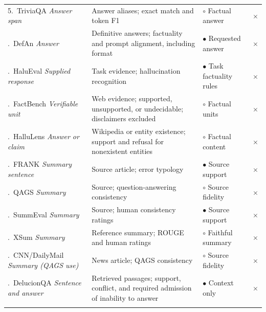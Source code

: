 \documentclass{clv2025}
\newcommand{\Stated}{\ensuremath{\bullet}}
\newcommand{\Weak}{\ensuremath{\circ}}
\newcommand{\Lacks}{\ensuremath{\times}}
\begin{document}
\begin{longtable}{@{}P{.26\linewidth}P{.28\linewidth}P{.21\linewidth}P{.20\linewidth}@{}}
5.~TriviaQA \citep{joshi_triviaqa_2017}\newline\emph{Answer span} & Answer aliases; exact match and token F1 & \Weak{} Factual answer & \Lacks\\.~DefAn \citep{rahman_defan_2024}\newline\emph{Answer} & Definitive answers; factuality and prompt alignment, including format & \Stated{} Requested answer & \Lacks\\.~HaluEval \citep{li_halueval_2023}\newline\emph{Supplied response} & Task evidence; hallucination recognition & \Stated{} Task factuality rules & \Lacks\\.~FactBench \citep{bayat_factbench_2024}\newline\emph{Verifiable unit} & Web evidence; supported, unsupported, or undecidable; disclaimers excluded & \Weak{} Factual units & \Lacks\\.~HalluLens \citep{bang_hallulens_2025}\newline\emph{Answer or claim} & Wikipedia or entity existence; support and refusal for nonexistent entities & \Weak{} Factual content & \Lacks\\.~FRANK \citep{pagnoni_understanding_2021}\newline\emph{Summary sentence} & Source article; error typology & \Stated{} Source support & \Lacks\\.~QAGS \citep{wang_asking_2020}\newline\emph{Summary} & Source; question-answering consistency & \Weak{} Source fidelity & \Lacks\\.~SummEval \citep{fabbri_summeval_2021}\newline\emph{Summary} & Source; human consistency ratings & \Stated{} Source support & \Lacks\\.~XSum \citep{narayan_xsum_2018}\newline\emph{Summary} & Reference summary; ROUGE and human ratings & \Weak{} Faithful summary & \Lacks\\.~CNN/\allowbreak DailyMail \citep{hermann_teaching_2015,wang_asking_2020}\newline\emph{Summary (QAGS use)} & News article; QAGS consistency & \Weak{} Source fidelity & \Lacks\\.~DelucionQA \citep{sadat_delucionqa_2023}\newline\emph{Sentence and answer} & Retrieved passages; support, conflict, and required admission of inability to answer & \Stated{} Context only & \Lacks\\\addlinespace[1pt]

\end{longtable}
\end{document}
